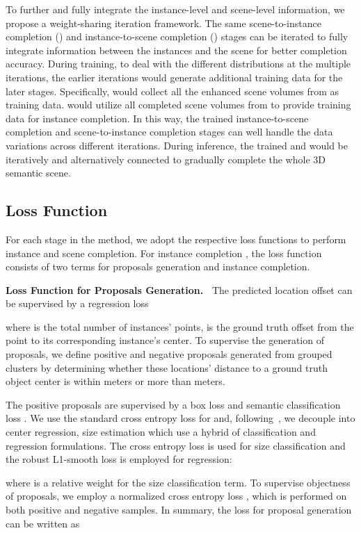 \documentclass[final]{cvpr}
\begin{document}
To further and fully integrate the instance-level and scene-level information, we propose a weight-sharing iteration framework. The same scene-to-instance completion () and instance-to-scene completion () stages can be iterated to fully integrate information between the instances and the scene for better completion accuracy.
During training, to deal with the different distributions at the multiple iterations, the earlier iterations would generate additional training data for the later stages. Specifically,  would collect all the enhanced scene volumes from  as training data.  would utilize all completed scene volumes from  to provide training data for instance completion. In this way, the trained instance-to-scene completion and scene-to-instance completion stages can well handle the data variations across different iterations.
During inference, the trained  and  would be iteratively and alternatively connected to gradually complete the whole 3D semantic scene.


\subsection{Loss Function}
\vspace{-0.1cm}
For each stage in the method, we adopt the respective loss functions to perform instance and scene completion. For instance completion , the loss function consists of two terms for proposals generation and instance completion.

\noindent \textbf{Loss Function for Proposals Generation.~}
The predicted location offset  can be supervised by
a regression loss

where  is the total number of instances' points,  is the ground truth offset from the point  to its corresponding instance's center.
To supervise the generation of proposals, we define positive and negative proposals generated from grouped clusters by determining whether these locations' distance to a ground truth object center is within  meters or more than  meters.

The positive proposals are supervised by a box loss  and semantic classification loss .
We use the standard cross entropy loss for  and, following~\cite{qi2019deep,qi2018frustum}, we decouple  into center regression, size estimation which use a hybrid of classification and regression formulations. The cross entropy loss is used for size classification and the robust L1-smooth loss is employed for regression:

where  is a relative weight for the size classification term.
To supervise objectness of proposals, we employ a normalized cross entropy loss , which is performed on both positive and negative samples. In summary, the loss for proposal generation can be written as
\end{document}
